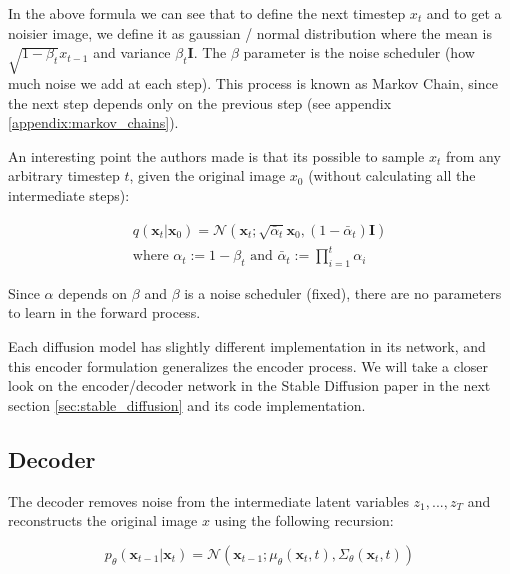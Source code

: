 In the above formula we can see that to define the next timestep $x_t$ and to get a noisier image, we define it as gaussian / normal distribution where the mean is $\sqrt{1-\beta_t} x_{t-1}$ and variance $\beta_t \mathbf{I}$. The $\beta$ parameter is the noise scheduler (how much noise we add at each step). This process is known as Markov Chain, since the next step depends only on the previous step (see appendix \ref{appendix:markov_chains}).

An interesting point the authors made is that its possible to sample $x_t$ from any arbitrary timestep $t$, given the original image $x_0$ (without calculating all the intermediate steps):

\begin{equation*}
    \begin{aligned}
    q(\mathbf{x}_t|\mathbf{x}_0) = \mathcal{N}(\mathbf{x}_t; \sqrt{\bar{\alpha}_t}\mathbf{x}_0, (1 - \bar{\alpha}_t)\mathbf{I}) \\
    \text{where } \alpha_t := 1 - \beta_t \text{ and } \bar{\alpha}_t := \prod_{i=1}^{t} \alpha_i
    \end{aligned}
\end{equation*}

Since $\alpha$ depends on $\beta$ and $\beta$ is a noise scheduler (fixed), there are no parameters to learn in the forward process.

Each diffusion model has slightly different implementation in its network, and this encoder formulation generalizes the encoder process. We will take a closer look on the encoder/decoder network in the Stable Diffusion paper \cite{stable_diffusion} in the next section \ref{sec:stable_diffusion} and its code implementation. %










\subsection{Decoder}

The decoder removes noise from the intermediate latent variables $z_1, ..., z_T$ and reconstructs the original image $x$ using the following recursion:

\begin{equation*}
    p_\theta(\mathbf{x}_{t-1} | \mathbf{x}_t) = \mathcal{N}(\mathbf{x}_{t-1}; \mu_\theta(\mathbf{x}_t, t), \Sigma_\theta(\mathbf{x}_t, t))
\end{equation*}

